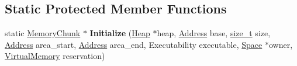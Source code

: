 \subsection*{Static Protected Member Functions}
\begin{DoxyCompactItemize}
\item 
\mbox{\label{classv8_1_1internal_1_1MemoryChunk_ab2013633d865c6b39eb0a09cc3229cfa}} 
static \mbox{\hyperlink{classv8_1_1internal_1_1MemoryChunk}{Memory\+Chunk}} $\ast$ {\bfseries Initialize} (\mbox{\hyperlink{classv8_1_1internal_1_1Heap}{Heap}} $\ast$heap, \mbox{\hyperlink{classuintptr__t}{Address}} base, \mbox{\hyperlink{classsize__t}{size\+\_\+t}} size, \mbox{\hyperlink{classuintptr__t}{Address}} area\+\_\+start, \mbox{\hyperlink{classuintptr__t}{Address}} area\+\_\+end, Executability executable, \mbox{\hyperlink{classv8_1_1internal_1_1Space}{Space}} $\ast$owner, \mbox{\hyperlink{classv8_1_1internal_1_1VirtualMemory}{Virtual\+Memory}} reservation)
\end{DoxyCompactItemize}
